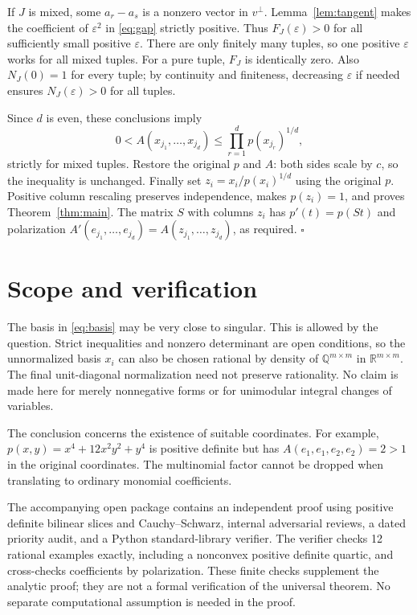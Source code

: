 \documentclass[11pt]{article}
\newcommand{\R}{\mathbb R}
\newcommand{\Q}{\mathbb Q}
\begin{document}
If $J$ is mixed, some $a_r-a_s$ is a nonzero vector in $v^\perp$.
Lemma~\ref{lem:tangent} makes the coefficient of $\varepsilon^2$ in
\eqref{eq:gap} strictly positive. Thus $F_J(\varepsilon)>0$ for all
sufficiently small positive $\varepsilon$. There are only finitely many
tuples, so one positive $\varepsilon$ works for all mixed tuples.
For a pure tuple, $F_J$ is identically zero. Also $N_J(0)=1$ for every
tuple; by continuity and finiteness, decreasing $\varepsilon$ if needed
ensures $N_J(\varepsilon)>0$ for all tuples.

Since $d$ is even, these conclusions imply
\[
 0<A(x_{j_1},\ldots,x_{j_d})
 \le \prod_{r=1}^d p(x_{j_r})^{1/d},
\]
strictly for mixed tuples. Restore the original $p$ and $A$: both sides
scale by $c$, so the inequality is unchanged. Finally set
$z_i=x_i/p(x_i)^{1/d}$ using the original $p$. Positive column rescaling
preserves independence, makes $p(z_i)=1$, and proves
Theorem~\ref{thm:main}. The matrix $S$ with columns $z_i$ has
$p'(t)=p(St)$ and polarization
$A'(e_{j_1},\ldots,e_{j_d})=A(z_{j_1},\ldots,z_{j_d})$, as required.
\hfill$\square$

\section{Scope and verification}
The basis in \eqref{eq:basis} may be very close to singular. This is allowed
by the question. Strict inequalities and nonzero determinant are open
conditions, so the unnormalized basis $x_i$ can also be chosen rational
by density of $\Q^{m\times m}$ in $\R^{m\times m}$. The final unit-diagonal
normalization need not preserve rationality. No claim is made here for
merely nonnegative forms or for unimodular integral changes of variables.

The conclusion concerns the existence of suitable coordinates. For example,
$p(x,y)=x^4+12x^2y^2+y^4$ is positive definite but has
$A(e_1,e_1,e_2,e_2)=2>1$ in the original coordinates. The multinomial
factor cannot be dropped when translating to ordinary monomial coefficients.

The accompanying open package contains an independent proof using
positive definite bilinear slices and Cauchy--Schwarz, internal adversarial
reviews, a dated priority audit, and a Python standard-library verifier.
The verifier checks 12 rational examples exactly, including a nonconvex
positive definite quartic, and cross-checks coefficients by polarization.
These finite checks supplement the analytic proof; they are not a formal
verification of the universal theorem. No separate computational assumption
is needed in the proof.
\end{document}
